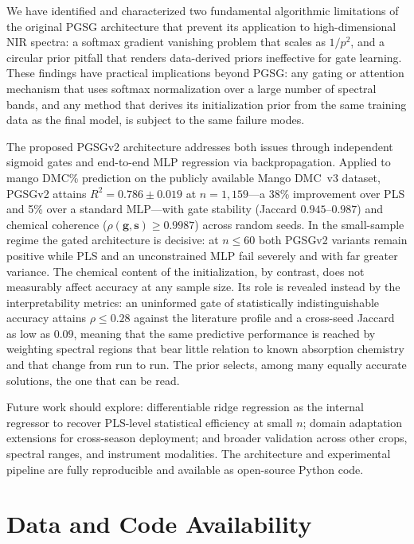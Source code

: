 \documentclass[preprint,12pt,hidelinks]{elsarticle}
\begin{document}
We have identified and characterized two fundamental algorithmic limitations
of the original PGSG architecture that prevent its application to
high-dimensional NIR spectra: a softmax gradient vanishing problem that
scales as $1/p^2$, and a circular prior pitfall that renders
data-derived priors ineffective for gate learning. These findings have
practical implications beyond PGSG: any gating or attention mechanism that
uses softmax normalization over a large number of spectral bands, and any
method that derives its initialization prior from the same training data as
the final model, is subject to the same failure modes.

The proposed PGSGv2 architecture addresses both issues through independent
sigmoid gates and end-to-end MLP regression via backpropagation. Applied
to mango DMC\% prediction on the publicly available Mango DMC~v3 dataset,
PGSGv2 attains $R^2 = 0.786 \pm 0.019$ at $n = 1{,}159$---a 38\%
improvement over PLS and 5\% over a standard MLP---with gate stability
(Jaccard $0.945$--$0.987$) and chemical coherence
($\rho(\mathbf{g}, \mathbf{s}) \geq 0.9987$) across random seeds. In the
small-sample regime the gated architecture is decisive: at $n \leq 60$ both
PGSGv2 variants remain positive while PLS and an unconstrained MLP fail
severely and with far greater variance. The chemical content of the
initialization, by contrast, does not measurably affect accuracy at any
sample size. Its role is revealed instead by the interpretability metrics:
an uninformed gate of statistically indistinguishable accuracy attains
$\rho \leq 0.28$ against the literature profile and a cross-seed Jaccard as
low as $0.09$, meaning that the same predictive performance is reached by
weighting spectral regions that bear little relation to known absorption
chemistry and that change from run to run. The prior selects, among many
equally accurate solutions, the one that can be read.

Future work should explore: differentiable ridge regression as the internal
regressor to recover PLS-level statistical efficiency at small $n$; domain
adaptation extensions for cross-season deployment; and broader validation
across other crops, spectral ranges, and instrument modalities. The
architecture and experimental pipeline are fully reproducible and available
as open-source Python code.

\section*{Data and Code Availability}
\end{document}
